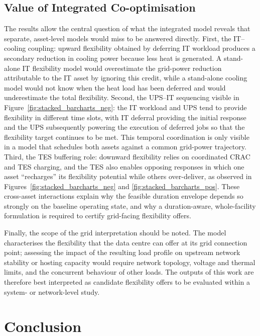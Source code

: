 \documentclass[lettersize,journal]{IEEEtran}
\newcommand{\rev}[1]{\textcolor{blue!70!black}{#1}}
\begin{document}
\subsection{\rev{Value of Integrated Co-optimisation}}\label{sec:integration-value}
\rev{The results allow the central question of what the integrated model reveals that separate, asset-level models would miss to be answered directly. First, the IT--cooling coupling: upward flexibility obtained by deferring IT workload produces a secondary reduction in cooling power because less heat is generated. A stand-alone IT flexibility model would overestimate the grid-power reduction attributable to the IT asset by ignoring this credit, while a stand-alone cooling model would not know when the heat load has been deferred and would underestimate the total flexibility. Second, the UPS--IT sequencing visible in Figure~\ref{fig:stacked_barcharts_neg}: the IT workload and UPS tend to provide flexibility in different time slots, with IT deferral providing the initial response and the UPS subsequently powering the execution of deferred jobs so that the flexibility target continues to be met. This temporal coordination is only visible in a model that schedules both assets against a common grid-power trajectory. Third, the TES buffering role: downward flexibility relies on coordinated CRAC and TES charging, and the TES also enables opposing responses in which one asset ``recharges'' its flexibility potential while others over-deliver, as observed in Figures~\ref{fig:stacked_barcharts_neg} and \ref{fig:stacked_barcharts_pos}. These cross-asset interactions explain why the feasible duration envelope depends so strongly on the baseline operating state, and why a duration-aware, whole-facility formulation is required to certify grid-facing flexibility offers.}

\rev{Finally, the scope of the grid interpretation should be noted. The model characterises the flexibility that the data centre can offer at its grid connection point; assessing the impact of the resulting load profile on upstream network stability or hosting capacity would require network topology, voltage and thermal limits, and the concurrent behaviour of other loads. The outputs of this work are therefore best interpreted as candidate flexibility offers to be evaluated within a system- or network-level study.}

\section{Conclusion}
\end{document}
